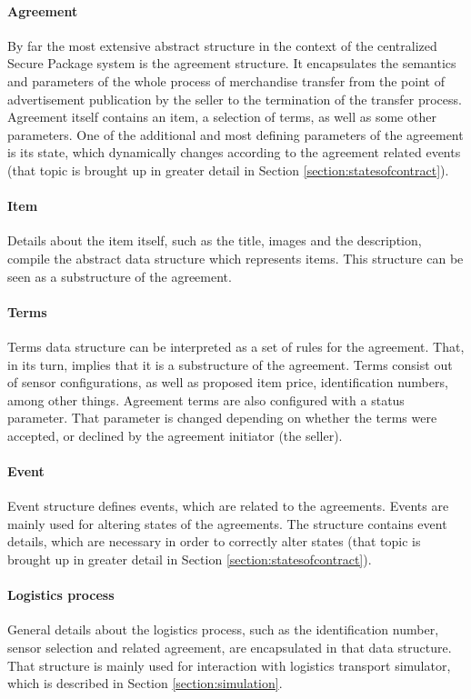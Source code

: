 \paragraph{Agreement}
By far the most extensive abstract structure in the context of the centralized Secure Package system is the agreement structure. It encapsulates the semantics and parameters of the whole process of merchandise transfer from the point of advertisement publication by the seller to the termination of the transfer process. Agreement itself contains an item, a selection of terms, as well as some other parameters. One of the additional and most defining parameters of the agreement is its state, which dynamically changes according to the agreement related events (that topic is brought up in greater detail in Section \ref{section:statesofcontract}).

\paragraph{Item}
Details about the item itself, such as the title, images and the description, compile the abstract data structure which represents items. This structure can be seen as a substructure of the agreement.

\paragraph{Terms}
Terms data structure can be interpreted as a set of rules for the agreement. That, in its turn, implies that it is a substructure of the agreement. Terms consist out of sensor configurations, as well as proposed item price, identification numbers, among other things. Agreement terms are also configured with a status parameter. That parameter is changed depending on whether the terms were accepted, or declined by the agreement initiator (the seller). 

\paragraph{Event}
Event structure defines events, which are related to the agreements. Events are mainly used for altering states of the agreements. The structure contains event details, which are necessary in order to correctly alter states (that topic is brought up in greater detail in Section \ref{section:statesofcontract}).

\paragraph{Logistics process}
General details about the logistics process, such as the identification number, sensor selection and related agreement, are encapsulated in that data structure. That structure is mainly used for interaction with logistics transport simulator, which is described in Section \ref{section:simulation}.

